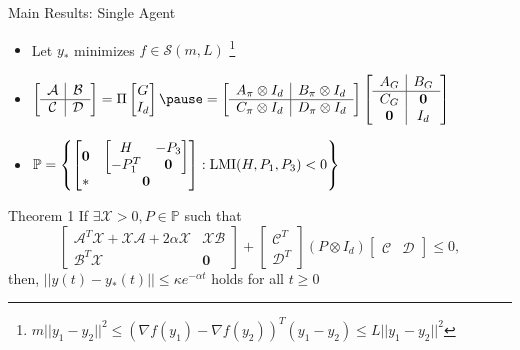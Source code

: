 \documentclass{beamer}
\begin{document}
\begin{frame}{Main Results: Single Agent}
		\begin{itemize}
			\item Let $y_*$ minimizes $f\in \mathcal{S}(m,L)$
			\footnote{$m||y_1-y_2||^2 \leq  (\nabla f(y_1)-\nabla f(y_2))^T(y_1-y_2) \leq L ||y_1-y_2||^2$} 
			\pause
			\item $\left[\begin{array}{c|c}
				\mathcal{A}     &  \mathcal{B}\\
				\hline
				\mathcal{C}     &  \mathcal{D}
			\end{array}\right]=\Pi \begin{bmatrix}
			G\\
			I_{d}
		\end{bmatrix}
			\pause 
			=
			\left[
			\begin{array}{c|c}
			A_{\pi} \otimes I_{d} & B_{\pi} \otimes I_{d} \\
			\hline
			C_{\pi} \otimes I_{d} & D_{\pi} \otimes I_{d}
		\end{array}
	\right]\left[
	\begin{array}{c|c}
		A_{G} & B_{G} \\
		\hline
		C_{G} 		& \mathbf{0} \\
		\mathbf{0} 	& I_d
	\end{array}
	\right]$
			\pause 
			\item $\mathbb{P}=\left\{
			\begin{bmatrix}
				\mathbf{0}  & \begin{bmatrix}
					H  & -P_3 \\
					-P_1^T    & \mathbf{0}
				\end{bmatrix} \\
				*    & \mathbf{0}
			\end{bmatrix}: \textnormal{LMI}(H,P_1,P_3)<0
			\right\}$
		\end{itemize}
	\pause 
	\begin{block}{Theorem 1}
		If $\exists \mathcal{X}>0,P \in \mathbb{P}$ such that
		\begin{equation*}%
			\begin{bmatrix}
				\mathcal{A}^T\mathcal{X}+\mathcal{X}\mathcal{A}+2\alpha \mathcal{X}  & \mathcal{X}\mathcal{B} \\
				\mathcal{B}^T\mathcal{X}    & \mathbf{0}
			\end{bmatrix}
			+
			\begin{bmatrix}
				\mathcal{C}^T \\
				\mathcal{D}^T 
			\end{bmatrix}
			( P\otimes I_d)
			\begin{bmatrix}
				\mathcal{C} & \mathcal{D} 
			\end{bmatrix}
			\leq 
			0,
		\end{equation*}
		then, $||y(t)-y_*(t)||\leq \kappa e^{-\alpha t}$ holds for all $t\geq 0$
	\end{block}
\end{frame}
\end{document}
